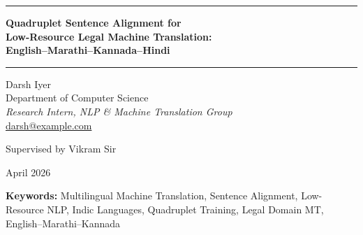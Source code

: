 \documentclass[11pt,a4paper]{article}
\begin{document}
\begin{titlepage}
  \centering
  \vspace*{1.5cm}

  {\color{darkblue}\rule{\linewidth}{2pt}}
  \vspace{0.4cm}

  {\LARGE\bfseries\color{darkblue}
    Quadruplet Sentence Alignment for\\[0.3em]
    Low-Resource Legal Machine Translation:\\[0.3em]
    English--Marathi--Kannada--Hindi
  }

  \vspace{0.4cm}
  {\color{darkblue}\rule{\linewidth}{0.8pt}}

  \vspace{1.2cm}

  {\large Darsh Iyer}\\[0.2em]
  {\normalsize Department of Computer Science}\\[0.1em]
  {\normalsize \textit{Research Intern, NLP \& Machine Translation Group}}\\[0.5em]
  {\small \href{mailto:darsh@example.com}{darsh@example.com}}

  \vspace{1cm}
  {\small Supervised by Vikram Sir}

  \vspace{1.5cm}
  {\small April 2026}

  \vfill
  \colorbox{tableheader}{%
    \begin{minipage}{0.85\linewidth}
      \vspace{0.3cm}
      \centering
      \small\textbf{Keywords:} Multilingual Machine Translation,
      Sentence Alignment, Low-Resource NLP, Indic Languages,
      Quadruplet Training, Legal Domain MT, English--Marathi--Kannada
      \vspace{0.3cm}
    \end{minipage}
  }
\end{titlepage}
\end{document}
